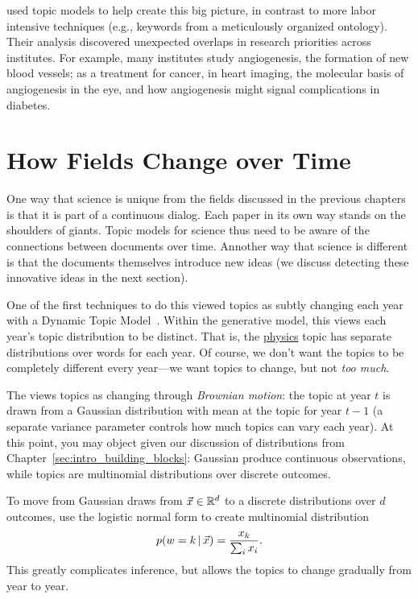 \citet{talley-11} used topic models to help create this big picture,
in contrast to more labor intensive techniques (e.g., keywords from a
meticulously organized ontology).  Their analysis discovered
unexpected overlaps in research priorities across institutes.  For
example, many institutes study angiogenesis, the formation of new
blood vessels; as a treatment for cancer, in heart imaging, the
molecular basis of angiogenesis in the eye, and how angiogenesis might
signal complications in diabetes.

\section{How Fields Change over Time}
\label{sec:sci_change}

One way that science is unique from the fields discussed in the
previous chapters is that it is part of a continuous dialog.  Each
paper in its own way stands on the shoulders of giants. Topic models
for science thus need to be aware of the connections between documents
over time.  Annother way that science is different is that the
documents themselves introduce new ideas (we discuss detecting these
innovative ideas in the next section).

One of the first techniques to do this viewed topics as subtly
changing each year with a Dynamic Topic Model~\citep[]{blei-06b}.  Within the generative model,
this views each year's topic distribution to be distinct.  That is,
the \underline{physics} topic has separate distributions over words
for each year.  Of course, we don't want the topics to be completely
different every year---we want topics to change, but not \emph{too
  much}.

The  views topics as changing through \emph{Brownian
  motion}: the topic at year $t$ is drawn from a Gaussian distribution
with mean at the topic for year $t-1$ (a separate variance parameter
controls how much topics can vary each year).  At this point, you may
object given our discussion of distributions from
Chapter~\ref{sec:intro_building_blocks}: Gaussian produce continuous
observations, while topics are multinomial distributions over discrete
outcomes.

To move from Gaussian draws from $\vec x \in \mathbb{R}^d$ to a discrete distributions
over $d$ outcomes, \citet{blei-06b} use the logistic normal form to
create multinomial distribution
\begin{equation}
p(w=k \, | \, \vec x)  = \frac{x_k}{\sum_i x_i}.
\end{equation}
This greatly complicates inference, but allows the topics to change
gradually from year to year.

